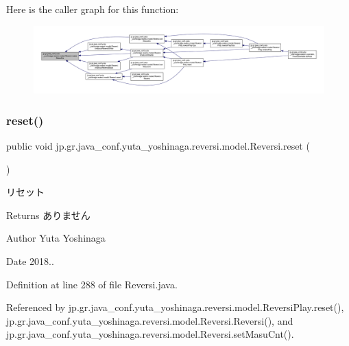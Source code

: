 Here is the caller graph for this function\+:\nopagebreak
\begin{figure}[H]
\begin{center}
\leavevmode
\includegraphics[width=350pt]{classjp_1_1gr_1_1java__conf_1_1yuta__yoshinaga_1_1reversi_1_1model_1_1_reversi_a9929ed36140ddc25923ede99f86564c3_icgraph}
\end{center}
\end{figure}
\mbox{\label{classjp_1_1gr_1_1java__conf_1_1yuta__yoshinaga_1_1reversi_1_1model_1_1_reversi_a497552844cbae36207f2d8c836a26b8e}} 
\subsubsection{\texorpdfstring{reset()}{reset()}}
{\footnotesize\ttfamily public void jp.\+gr.\+java\+\_\+conf.\+yuta\+\_\+yoshinaga.\+reversi.\+model.\+Reversi.\+reset (\begin{DoxyParamCaption}{ }\end{DoxyParamCaption})}



リセット 

\begin{DoxyReturn}{Returns}
ありません 
\end{DoxyReturn}
\begin{DoxyAuthor}{Author}
Yuta Yoshinaga 
\end{DoxyAuthor}
\begin{DoxyDate}{Date}
2018.. 
\end{DoxyDate}


Definition at line 288 of file Reversi.\+java.



Referenced by jp.\+gr.\+java\+\_\+conf.\+yuta\+\_\+yoshinaga.\+reversi.\+model.\+Reversi\+Play.\+reset(), jp.\+gr.\+java\+\_\+conf.\+yuta\+\_\+yoshinaga.\+reversi.\+model.\+Reversi.\+Reversi(), and jp.\+gr.\+java\+\_\+conf.\+yuta\+\_\+yoshinaga.\+reversi.\+model.\+Reversi.\+set\+Masu\+Cnt().

